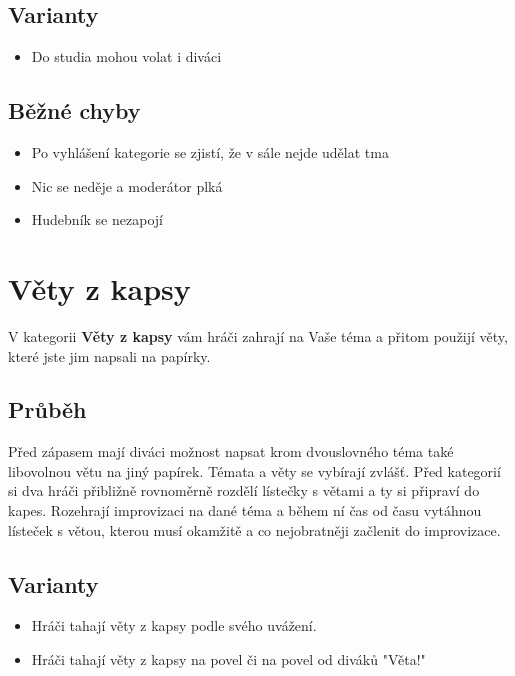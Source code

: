 \subsection{ Varianty } \begin{itemize}
\item Do studia mohou volat i diváci
\end{itemize}
 
\subsection{ Běžné chyby } \begin{itemize}
\item Po vyhlášení kategorie se zjistí, že v sále nejde udělat tma
\item Nic se neděje a moderátor plká
\item Hudebník se nezapojí
\end{itemize}
 
 
 
 
 
 
\needspace{5cm} \section{Věty z kapsy} \label{věty z kapsy}  
 
 
V kategorii \textbf{Věty z kapsy}{} vám hráči zahrají na Vaše téma a přitom použijí věty, které jste jim napsali na papírky. 
 
 
\subsection{Průběh} Před zápasem mají diváci možnost napsat krom dvouslovného téma také libovolnou větu na jiný papírek. Témata a věty se vybírají zvlášť. Před kategorií si dva hráči přibližně rovnoměrně rozdělí lístečky s větami a ty si připraví do kapes. Rozehrají improvizaci na dané téma a během ní čas od času vytáhnou lísteček s větou, kterou musí okamžitě a co nejobratněji začlenit do improvizace.  
 
 
\subsection{ Varianty } \begin{itemize}
\item Hráči tahají věty z kapsy podle svého uvážení.
\item Hráči tahají věty z kapsy na povel  či na povel od diváků "Věta!"
\end{itemize}
 
